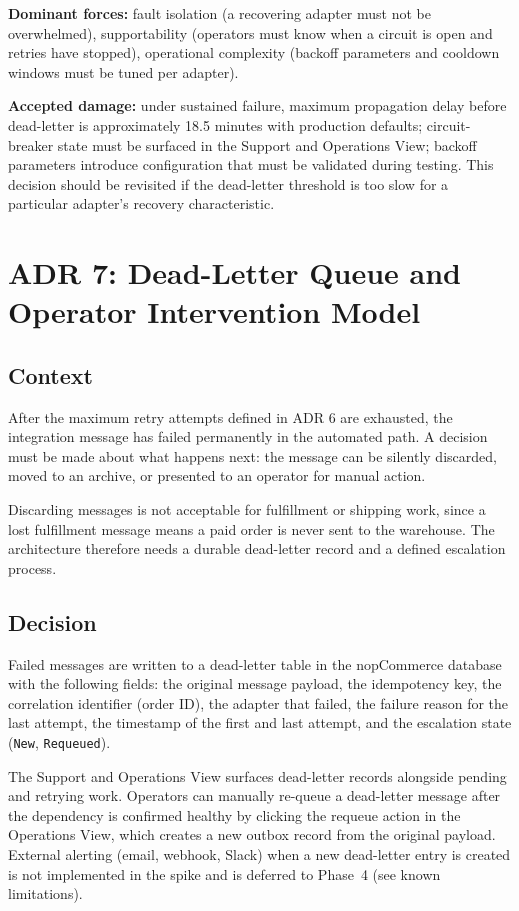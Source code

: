 \textbf{Dominant forces:} fault isolation (a recovering adapter must not be overwhelmed),
supportability (operators must know when a circuit is open and retries have stopped),
operational complexity (backoff parameters and cooldown windows must be tuned per adapter).

\textbf{Accepted damage:} under sustained failure, maximum propagation delay before
dead-letter is approximately 18.5 minutes with production defaults; circuit-breaker state
must be surfaced in the Support and Operations View; backoff parameters introduce
configuration that must be validated during testing. This decision should be revisited if
the dead-letter threshold is too slow for a particular adapter's recovery characteristic.

\section{ADR 7: Dead-Letter Queue and Operator Intervention Model}

\subsection{Context}

After the maximum retry attempts defined in ADR 6 are exhausted, the integration message has
failed permanently in the automated path. A decision must be made about what happens next:
the message can be silently discarded, moved to an archive, or presented to an operator for
manual action.

Discarding messages is not acceptable for fulfillment or shipping work, since a lost
fulfillment message means a paid order is never sent to the warehouse. The architecture
therefore needs a durable dead-letter record and a defined escalation process.

\subsection{Decision}

Failed messages are written to a dead-letter table in the nopCommerce database with the
following fields: the original message payload, the idempotency key, the correlation identifier
(order ID), the adapter that failed, the failure reason for the last attempt, the timestamp of
the first and last attempt, and the escalation state (\texttt{New}, \texttt{Requeued}).

The Support and Operations View surfaces dead-letter records alongside pending and retrying
work. Operators can manually re-queue a dead-letter message after the dependency is confirmed
healthy by clicking the requeue action in the Operations View, which creates a new outbox
record from the original payload. External alerting (email, webhook, Slack) when a new
dead-letter entry is created is not implemented in the spike and is deferred to Phase~4
(see known limitations).

